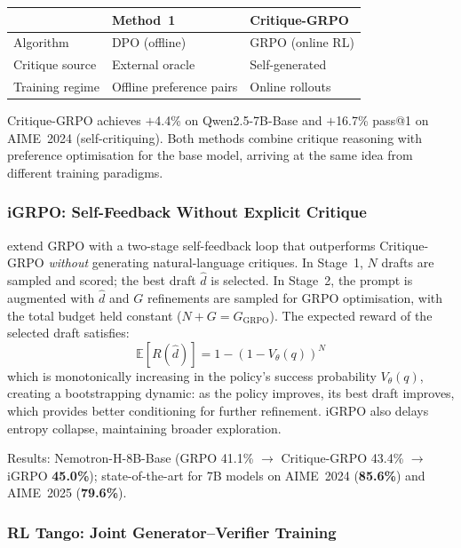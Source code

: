 \begin{center}
    \begin{tabular}{lll}
        \hline
                        & \textbf{Method~1}        & \textbf{Critique-GRPO} \\
        \hline
        Algorithm       & DPO (offline)            & GRPO (online RL)       \\
        Critique source & External oracle          & Self-generated         \\
        Training regime & Offline preference pairs & Online rollouts        \\
        \hline
    \end{tabular}
\end{center}

Critique-GRPO achieves $+$4.4\% on Qwen2.5-7B-Base and $+$16.7\% pass@1 on AIME~2024 (self-critiquing). Both methods combine critique reasoning with preference optimisation for the base model, arriving at the same idea from different training paradigms.

\subsubsection{iGRPO: Self-Feedback Without Explicit Critique}

\autocite{hatamizadeh2026igrpo} extend GRPO with a two-stage self-feedback loop that outperforms Critique-GRPO \emph{without} generating natural-language critiques. In Stage~1, $N$ drafts are sampled and scored; the best draft $\hat{d}$ is selected. In Stage~2, the prompt is augmented with $\hat{d}$ and $G$ refinements are sampled for GRPO optimisation, with the total budget held constant ($N + G = G_{\text{GRPO}}$). The expected reward of the selected draft satisfies:
\begin{equation}
    \mathbb{E}[R(\hat{d})] = 1 - (1 - V_\theta(q))^N
    \label{eq:igrpo}
\end{equation}
which is monotonically increasing in the policy's success probability $V_\theta(q)$, creating a bootstrapping dynamic: as the policy improves, its best draft improves, which provides better conditioning for further refinement. iGRPO also delays entropy collapse, maintaining broader exploration.

Results: Nemotron-H-8B-Base (GRPO 41.1\% $\to$ Critique-GRPO 43.4\% $\to$ iGRPO \textbf{45.0\%}); state-of-the-art for 7B models on AIME~2024 (\textbf{85.6\%}) and AIME~2025 (\textbf{79.6\%}).

\subsubsection{RL Tango: Joint Generator--Verifier Training}

